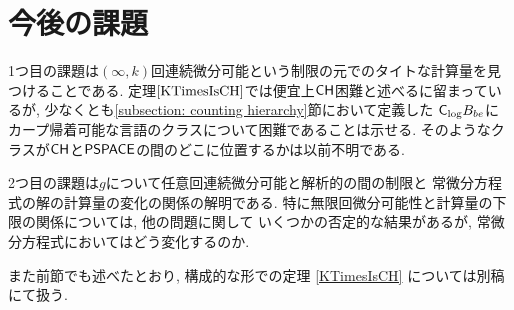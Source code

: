 \section{今後の課題}
1つ目の課題は$(\infty, k)$回連続微分可能という制限の元でのタイトな計算量を見つけることである.
定理$\ref{KTimesIsCH}$では便宜上$\mathsf{CH}$困難と述べるに留まっているが,
少なくとも\ref{subsection: counting hierarchy}節において定義した
$\mathsf{C}_{\log} B_{be}$にカープ帰着可能な言語のクラスについて困難であることは示せる.
そのようなクラスが$\mathsf{CH}$と$\mathsf{PSPACE}$の間のどこに位置するかは以前不明である.

2つ目の課題は$g$について任意回連続微分可能と解析的の間の制限と
常微分方程式の解の計算量の変化の関係の解明である.
特に無限回微分可能性と計算量の下限の関係については, 他の問題に関して
いくつかの否定的な結果があるが, 常微分方程式においてはどう変化するのか.

また前節でも述べたとおり, 構成的な形での定理 \ref{KTimesIsCH} については別稿にて扱う.
